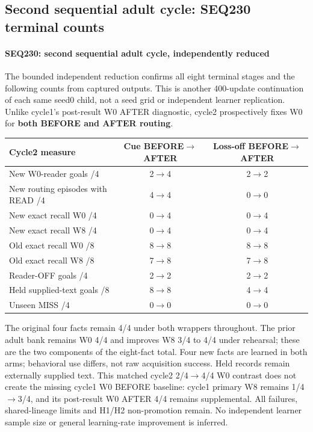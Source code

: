 \documentclass[11pt]{article}
\begin{document}
\subsection{Second sequential adult cycle: SEQ230 terminal counts}
\label{sec:adult2}
\paragraph{SEQ230: second sequential adult cycle, independently reduced}

The bounded independent reduction confirms all eight terminal stages and the
following counts from captured outputs. This is another
400-update continuation of each same seed0 child, not a seed grid or independent
learner replication. Unlike cycle1's post-result W0 AFTER diagnostic, cycle2
prospectively fixes W0 for \textbf{both BEFORE and AFTER routing}.

\begin{center}
\begin{tabular}{lcc}
\toprule
Cycle2 measure & Cue BEFORE$\to$AFTER & Loss-off BEFORE$\to$AFTER \\
\midrule
New W0-reader goals /4 & 2$\to$4 & 2$\to$2 \\
New routing episodes with READ /4 & 4$\to$4 & 0$\to$0 \\
New exact recall W0 /4 & 0$\to$4 & 0$\to$4 \\
New exact recall W8 /4 & 0$\to$4 & 0$\to$4 \\
Old exact recall W0 /8 & 8$\to$8 & 8$\to$8 \\
Old exact recall W8 /8 & 7$\to$8 & 7$\to$8 \\
Reader-OFF goals /4 & 2$\to$2 & 2$\to$2 \\
Held supplied-text goals /8 & 8$\to$8 & 4$\to$4 \\
Unseen MISS /4 & 0$\to$0 & 0$\to$0 \\
\bottomrule
\end{tabular}
\end{center}

The original four facts remain 4/4 under both wrappers throughout. The prior
adult bank remains W0 4/4 and improves W8 3/4 to 4/4 under rehearsal; these
are the two components of the eight-fact total. Four new facts are learned in both arms;
behavioral use differs, not raw acquisition success. Held records remain
externally supplied text. This matched cycle2 2/4$\to$4/4 W0 contrast does not
create the missing cycle1 W0 BEFORE baseline: cycle1 primary W8 remains
1/4$\to$3/4, and its post-result W0 AFTER 4/4 remains supplemental. All failures,
shared-lineage limits and H1/H2 non-promotion remain. No independent learner
sample size or general learning-rate improvement is inferred.
\end{document}
